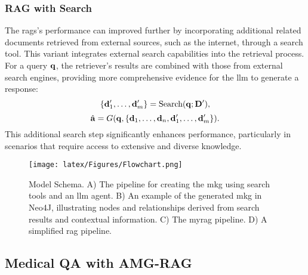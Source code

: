 \subsubsection{RAG with Search}
The \glspl{rag}'s performance can improved further by incorporating additional related documents retrieved from external sources, such as the internet, through a search tool. This variant integrates external search capabilities into the retrieval process. For a query \({\mathbf{q}}\), the retriever's results are combined with those from external search engines, providing more comprehensive evidence for the \gls{llm} to generate a response:  
\[
\{{\mathbf{d}}'_1, \ldots, {\mathbf{d}}'_m\} = \text{Search}({\mathbf{q}}; \mathbf{D'}),
\]  
\[
\hat{{\mathbf{a}}} = G({\mathbf{q}}, \{{\mathbf{d}}_1, \ldots, {\mathbf{d}}_n, {\mathbf{d}}'_1, \ldots, {\mathbf{d}}'_m\}).
\]  
This additional search step significantly enhances performance, particularly in scenarios that require access to extensive and diverse knowledge.
\begin{figure*}[t]
    \centering
\texttt{[image: latex/Figures/Flowchart.png]}
    \caption{Model Schema. A) The pipeline for creating the \gls{mkg} using search tools and an \gls{llm} agent. B) An example of the generated \gls{mkg} in Neo4J, illustrating nodes and relationships derived from search results and contextual information. C) The \gls{myrag} pipeline. D) A simplified \gls{rag} pipeline. }
    \label{fig:model_schema}
\end{figure*}

\subsection{Medical QA with AMG-RAG}


